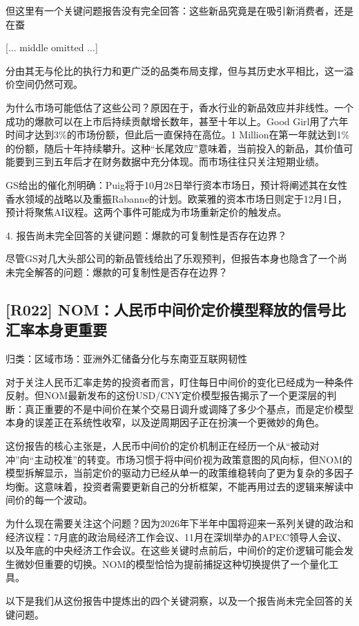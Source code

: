 \documentclass[11pt]{ctexart}
\begin{document}
但这里有一个关键问题报告没有完全回答：这些新品究竟是在吸引新消费者，还是在蚕

[... middle omitted ...]

分由其无与伦比的执行力和更广泛的品类布局支撑，但与其历史水平相比，这一溢价空间仍然可观。

为什么市场可能低估了这些公司？原因在于，香水行业的新品效应并非线性。一个成功的爆款可以在上市后持续贡献增长数年，甚至十年以上。Good Girl用了六年时间才达到3\%的市场份额，但此后一直保持在高位。1 Million在第一年就达到1\%的份额，随后十年持续攀升。这种“长尾效应”意味着，当前投入的新品，其价值可能要到三到五年后才在财务数据中充分体现。而市场往往只关注短期业绩。

GS给出的催化剂明确：Puig将于10月28日举行资本市场日，预计将阐述其在女性香水领域的战略以及重振Rabanne的计划。欧莱雅的资本市场日则定于12月1日，预计将聚焦AI议程。这两个事件可能成为市场重新定价的触发点。

4. 报告尚未完全回答的关键问题：爆款的可复制性是否存在边界？

尽管GS对几大头部公司的新品管线给出了乐观预判，但报告本身也隐含了一个尚未完全解答的问题：爆款的可复制性是否存在边界？

\subsection{[R022] NOM：人民币中间价定价模型释放的信号比汇率本身更重要}
{\small\color{refgray}归类：区域市场：亚洲外汇储备分化与东南亚互联网韧性}

对于关注人民币汇率走势的投资者而言，盯住每日中间价的变化已经成为一种条件反射。但NOM最新发布的这份USD/CNY定价模型报告揭示了一个更深层的判断：真正重要的不是中间价在某个交易日调升或调降了多少个基点，而是定价模型本身的误差正在系统性收窄，以及逆周期因子正在扮演一个更微妙的角色。

这份报告的核心主张是，人民币中间价的定价机制正在经历一个从“被动对冲”向“主动校准”的转变。市场习惯于将中间价视为政策意图的风向标，但NOM的模型拆解显示，当前定价的驱动力已经从单一的政策维稳转向了更为复杂的多因子均衡。这意味着，投资者需要更新自己的分析框架，不能再用过去的逻辑来解读中间价的每一个波动。

为什么现在需要关注这个问题？因为2026年下半年中国将迎来一系列关键的政治和经济议程：7月底的政治局经济工作会议、11月在深圳举办的APEC领导人会议、以及年底的中央经济工作会议。在这些关键时点前后，中间价的定价逻辑可能会发生微妙但重要的切换。NOM的模型恰恰为提前捕捉这种切换提供了一个量化工具。

以下是我们从这份报告中提炼出的四个关键洞察，以及一个报告尚未完全回答的关键问题。
\end{document}
